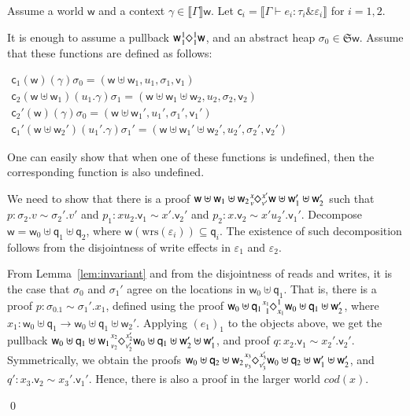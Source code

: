 \documentclass[orivec]{llncs}
\newcommand{\sq}[4]{\tensor*[^{#1}_{#2}]{\Diamond}{^{#3}_{#4}}}
\newcommand{\wrsin}[1]{\mathrm{wrs}({#1})}
\newcommand{\eff}{\varepsilon}
\newcommand{\sem}[1]{\ensuremath{\llbracket {#1} \rrbracket}}
\renewenvironment{proof}{\vspace{-1mm} \noindent {\bf Proof}\quad}{\qed}
\newcommand\w{\ensuremath{\mathsf{w}}\xspace}
\newcommand\q{\ensuremath{\mathsf{q}}\xspace}
\newcommand{\Astores}{\mathfrak{S}}
\newcommand\val{\ensuremath{\mathsf{v}}\xspace}
\newcommand\cval{\ensuremath{\mathsf{c}}\xspace}
\newcommand{\ety}[2]{{#1}\mathrel{\&}{#2}}
\begin{document}
\begin{proof}
Assume a world \w and a context $\gamma \in \sem{\Gamma}\w$.
Let $\cval_i = \sem{\Gamma \vdash e_i : \ety{\tau_i}{\eff_i}}$ for
$i = 1,2$. 

It is enough to assume a pullback 
$\w \sq{1}{1}{1}{1} \w$, and an abstract heap $\sigma_0 \in
\Astores \w$. 
Assume that these functions are defined as follows:

\(
 \begin{array}{l}
 \cval_1(\w)(\gamma)\sigma_0 = (\w \uplus \w_1, u_1, \sigma_1, \val_1)\\
 \cval_2(\w\uplus\w_1)(u_1.\gamma) \sigma_1 = (\w \uplus \w_1 \uplus
\w_2, u_2, \sigma_2, \val_2)\\
 \cval_2'(\w)(\gamma)\sigma_0 = (\w \uplus \w_1', u_1', \sigma_1',
\val_1')\\
 \cval_1'(\w\uplus\w_2')(u_1'.\gamma) \sigma_1' = (\w \uplus \w_1'
\uplus \w_2', u_2', \sigma_2',\val_2')
 \end{array}
\)

\noindent
One can easily show that when one of these functions is undefined, then 
the corresponding function is also undefined. 

We need to show that there is a proof $\w \uplus \w_1 \uplus \w_2
\sq{x}{v}{x'}{v'} \w \uplus \w_1' \uplus \w_2'$ such that
$p : \sigma_2.v \sim \sigma_2'.v'$ and $p_1 : xu_2.\val_1 \sim x'.\val_2'$
and $p_2 : x.\val_2 \sim x'u_2'.\val_1'$.
Decompose $\w = \w_0 \uplus \q_1 \uplus \q_2$, where
$\w(\wrsin{\eff_i}) \subseteq \q_i$. 
The existence of such decomposition follows from the disjointness of write
effects in $\eff_1$ and $\eff_2$.

From Lemma~\ref{lem:invariant} and from 
the disjointness of reads and writes, it is the case that $\sigma_0$ and
$\sigma_1'$ agree on the locations in $\w_0 \uplus \q_1$.
That is, there is a proof $p : \sigma_0.1 \sim \sigma_1'.x_1$, defined 
using the proof $\w_0 \uplus \q_1 \sq{x_1}{1}{1}{x_1} \w_0
\uplus \q_1 \uplus \w_2'
$, where $x_1 : \w_0 \uplus \q_1 \to \w_0 \uplus \q_1 \uplus \w_2'$.
Applying $(e_1)_1$ to the objects above,
we get the pullback $\w_0 \uplus \q_1 \uplus \w_1 \sq{x_2}{v_2}{x_2'}{v_2'}
\w_0 \uplus \q_1
\uplus
\w_2' \uplus \w_1'$, and  proof $q : x_2.\val_1 \sim
x_2'.\val_2'$. Symmetrically, we obtain the proofs 
$\w_0 \uplus \q_2 \uplus \w_2 \sq{x_3}{v_3}{x_3'}{v_3'} \w_0 \uplus \q_2
\uplus \w_1' \uplus \w_2'$, and  $q' : x_3.\val_2 \sim
x_3'.\val_1'$. Hence, there is also a proof in the larger world $cod(x)$.


\end{proof}
\end{document}
